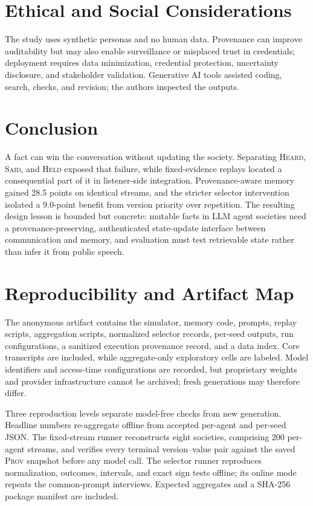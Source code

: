 \documentclass[sigconf,anonymous]{acmart}
\newcommand{\heard}{\textsc{Heard}}
\newcommand{\said}{\textsc{Said}}
\newcommand{\held}{\textsc{Held}}
\newcommand{\prov}{\textsc{Prov}}
\begin{document}
\section{Ethical and Social Considerations}

The study uses synthetic personas and no human data.  Provenance can improve auditability but may
also enable surveillance or misplaced trust in credentials; deployment requires data minimization,
credential protection, uncertainty disclosure, and stakeholder validation.  Generative AI tools
assisted coding, search, checks, and revision; the authors inspected the outputs.

\section{Conclusion}

A fact can win the conversation without updating the society.  Separating \heard{}, \said{}, and
\held{} exposed that failure, while fixed-evidence replays located a consequential part of it in
listener-side integration.  Provenance-aware memory gained 28.5 points on identical streams, and
the stricter selector intervention isolated a 9.0-point benefit from version priority over
repetition.  The resulting design lesson is bounded but concrete: mutable facts in LLM agent
societies need a provenance-preserving, authenticated state-update interface between
communication and memory, and evaluation must test retrievable state rather than infer it from
public speech.

\clearpage



\clearpage
\appendix

\section{Reproducibility and Artifact Map}
\label{app:repro}
\label{app:reproduction}

The anonymous artifact contains the simulator, memory code, prompts, replay scripts, aggregation
scripts, normalized selector records, per-seed outputs, run configurations, a sanitized execution
provenance record, and a data index.
Core transcripts are included, while aggregate-only exploratory cells are labeled.  Model
identifiers and access-time configurations are recorded, but proprietary weights and provider
infrastructure cannot be archived; fresh generations may therefore differ.

Three reproduction levels separate model-free checks from new generation.  Headline numbers
re-aggregate offline from accepted per-agent and per-seed JSON.  The fixed-stream runner
reconstructs eight societies, comprising 200 per-agent streams, and verifies every terminal
version--value pair against the saved \prov{} snapshot before any model call.  The selector
runner reproduces normalization, outcomes, intervals, and exact sign tests offline; its online
mode repeats the common-prompt interviews.  Expected aggregates and a SHA-256 package manifest
are included.
\end{document}
